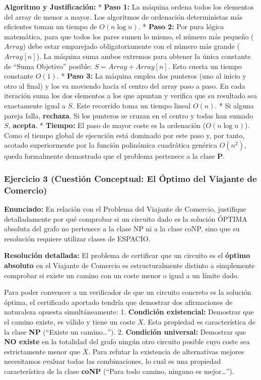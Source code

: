 \documentclass[12pt]{book} %
\begin{document}
\textbf{Algoritmo y Justificación:} * \textbf{Paso 1:} La máquina ordena
todos los elementos del array de menor a mayor. Los algoritmos de
ordenación deterministas más eficientes toman un tiempo de
\textbf{\(O(n \log n)\)}. * \textbf{Paso 2:} Por pura lógica matemática,
para que todos los pares sumen lo mismo, el número más pequeño
(\(Array\)) debe estar emparejado obligatoriamente con el número más
grande (\(Array[n]\)). La máquina suma ambos extremos para obtener la
única constante de ``Suma Objetivo'' posible: \(S = Array + Array[n]\).
Esto cuesta un tiempo constante \(O(1)\). * \textbf{Paso 3:} La máquina
emplea dos punteros (uno al inicio y otro al final) y los va moviendo
hacia el centro del array paso a paso. En cada iteración suma los dos
elementos a los que apuntan y verifica que su resultado sea exactamente
igual a \(S\). Este recorrido toma un tiempo lineal \textbf{\(O(n)\)}. *
Si alguna pareja falla, \textbf{rechaza}. Si los punteros se cruzan en
el centro y todas han sumado \(S\), \textbf{acepta}. * \textbf{Tiempo:}
El paso de mayor coste es la ordenación (\(O(n \log n)\)). Como el
tiempo global de ejecución está dominado por este paso y, por tanto,
acotado superiormente por la función polinómica cuadrática genérica
\(O(n^2)\), queda formalmente demostrado que el problema pertenece a la
clase \textbf{P}.

\hypertarget{ejercicio-3-cuestiuxf3n-conceptual-el-uxf3ptimo-del-viajante-de-comercio}{%
\subsubsection{Ejercicio 3 (Cuestión Conceptual: El Óptimo del Viajante
de
Comercio)}\label{ejercicio-3-cuestiuxf3n-conceptual-el-uxf3ptimo-del-viajante-de-comercio}}

\textbf{Enunciado:} En relación con el Problema del Viajante de
Comercio, justifique detalladamente por qué comprobar si un circuito
dado es la solución ÓPTIMA absoluta del grafo no pertenece a la clase NP
ni a la clase coNP, sino que su resolución requiere utilizar clases de
ESPACIO.

\textbf{Resolución detallada:} El problema de certificar que un circuito
es el \textbf{óptimo absoluto} en el Viajante de Comercio es
estructuralmente distinto a simplemente comprobar si existe un camino
con un coste menor o igual a un límite dado.

Para poder convencer a un verificador de que un circuito concreto es la
solución óptima, el certificado aportado tendría que demostrar dos
afirmaciones de naturaleza opuesta simultáneamente: 1. \textbf{Condición
existencial:} Demostrar que el camino existe, es válido y tiene un coste
\(X\). Esta propiedad es característica de la clase \textbf{NP}
(``Existe un camino\ldots{}''). 2. \textbf{Condición universal:}
Demostrar que \textbf{NO existe} en la totalidad del grafo ningún otro
circuito posible cuyo coste sea estrictamente menor que \(X\). Para
refutar la existencia de alternativas mejores necesitamos evaluar todas
las combinaciones, lo cual es una propiedad característica de la clase
\textbf{coNP} (``Para todo camino, ninguno es mejor\ldots{}'').
\end{document}

